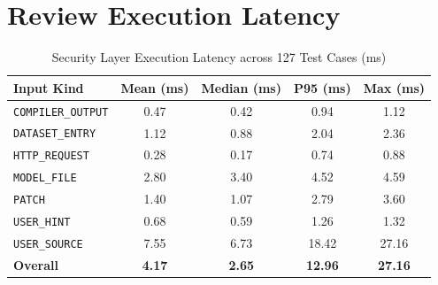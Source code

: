 \documentclass{article}
\begin{document}
\section{Review Execution Latency}
\begin{table}[htbp]
\centering
\caption{Security Layer Execution Latency across 127 Test Cases (ms)}
\label{tab:latency}
\begin{tabularx}{\textwidth}{l c c c c}
\toprule
\textbf{Input Kind} & \textbf{Mean (ms)} & \textbf{Median (ms)} & \textbf{P95 (ms)} & \textbf{Max (ms)} \\
\midrule
\texttt{COMPILER\_OUTPUT} & 0.47 & 0.42 & 0.94 & 1.12 \\
\texttt{DATASET\_ENTRY} & 1.12 & 0.88 & 2.04 & 2.36 \\
\texttt{HTTP\_REQUEST} & 0.28 & 0.17 & 0.74 & 0.88 \\
\texttt{MODEL\_FILE} & 2.80 & 3.40 & 4.52 & 4.59 \\
\texttt{PATCH} & 1.40 & 1.07 & 2.79 & 3.60 \\
\texttt{USER\_HINT} & 0.68 & 0.59 & 1.26 & 1.32 \\
\texttt{USER\_SOURCE} & 7.55 & 6.73 & 18.42 & 27.16 \\
\midrule \textbf{Overall} & \textbf{4.17} & \textbf{2.65} & \textbf{12.96} & \textbf{27.16} \\
\bottomrule
\end{tabularx}
\end{table}
\end{document}
